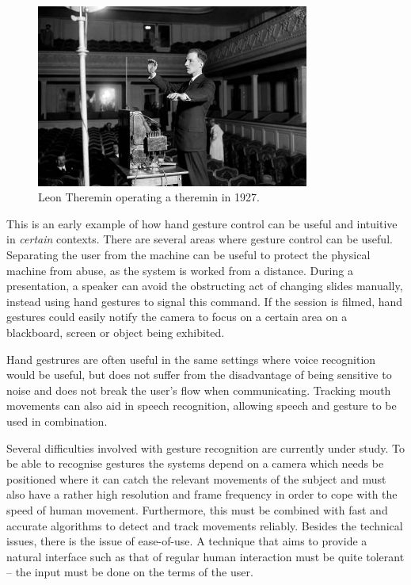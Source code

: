 \begin{figure}[]
\includegraphics[width=0.8\textwidth] {bilder/teremin.jpg}
\caption{Leon Theremin operating a theremin in 1927.}
\label{theremin}
\end{figure}
\nocite{theremin}

This is an early example of how hand gesture control can be useful and intuitive in \emph{certain} contexts. There are several areas where gesture control can be useful. Separating the user from the machine can be useful to protect the physical machine from abuse, as the system is worked from a distance. During a presentation, a speaker can avoid the obstructing act of changing slides manually, instead using hand gestures to signal this command. If the session is filmed, hand gestures could easily notify the camera to focus on a certain area on a blackboard, screen or object being exhibited.

Hand gestrures are often useful in the same settings where voice recognition would be useful, but does not suffer from the disadvantage of being sensitive to noise and does not break the user's flow when communicating\cite{Hardenberg01bare-handhuman-computer}. Tracking mouth movements can also aid in speech recognition, allowing speech and gesture to be used in combination\cite{conf/icmcs/LiuK10}\cite{conf/icmcs/SarginAKOYWEYT06}.

Several difficulties involved with gesture recognition are currently under study. To be able to recognise gestures the systems depend on a camera which needs be positioned where it can catch the relevant movements of the subject and must also have a rather high resolution and frame frequency in order to cope with the speed of human movement. Furthermore, this must be combined with fast and accurate algorithms to detect and track movements reliably. Besides the technical issues, there is the issue of ease-of-use. A technique that aims to provide a natural interface such as that of regular human interaction must be quite tolerant -- the input must be done on the terms of the user. 

